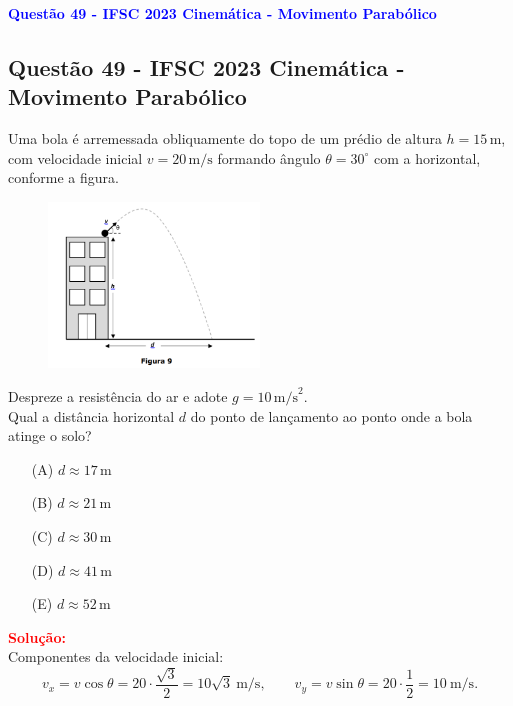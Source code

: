 \begin{flushleft}
\textbf{\textcolor{blue}{\Large Quest\~ao 49 - IFSC 2023 Cinemática - Movimento Parab\'olico}}\\
\noindent

\subsection{Quest\~ao 49 - IFSC 2023 Cinemática - Movimento Parab\'olico}

Uma bola é arremessada obliquamente do topo de um prédio de altura $h=15\,\text{m}$, com velocidade inicial $v=20\,\text{m/s}$ formando ângulo 
$\theta=30^\circ$ com a horizontal, conforme a figura. 

\begin{figure}[!h]
\centering
\includegraphics[width=0.5\textwidth]{figures/momento_balistico.png} 
\end{figure}

Despreze a resistência do ar e adote $g=10\,\text{m/s}^2$.\\
Qual a distância horizontal $d$ do ponto de lançamento ao ponto onde a bola atinge o solo?

\begin{itemize}
\item[(A)] $d \approx 17\,\text{m}$
\item[(B)] $d \approx 21\,\text{m}$
\item[(C)] $d \approx 30\,\text{m}$
\item[(D)] $d \approx 41\,\text{m}$
\item[(E)] $d \approx 52\,\text{m}$
\end{itemize}

\vspace{0.5cm}

\textcolor{red}{\textbf{Solução:}}\\

Componentes da velocidade inicial:
\[
v_x=v\cos\theta=20\cdot\frac{\sqrt{3}}{2}=10\sqrt{3}\ \text{m/s},\qquad
v_y=v\sin\theta=20\cdot\frac{1}{2}=10\ \text{m/s}.
\]


\end{flushleft}
